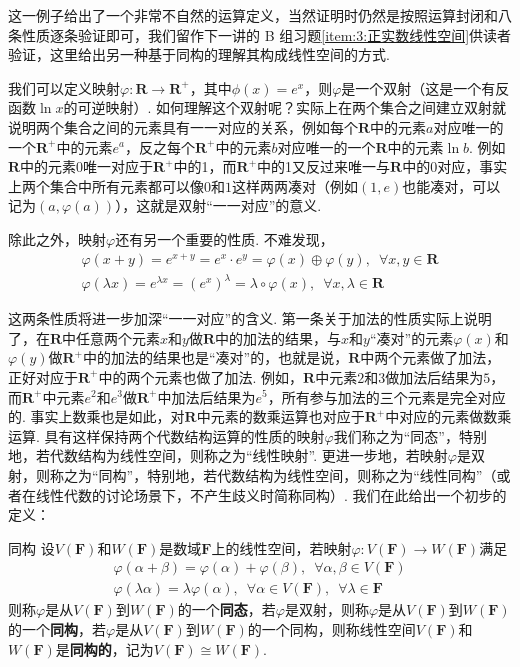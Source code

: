 这一例子给出了一个非常不自然的运算定义，当然证明时仍然是按照运算封闭和八条性质逐条验证即可，我们留作下一讲的 B 组习题\ref{item:3:正实数线性空间}供读者验证，这里给出另一种基于同构的理解其构成线性空间的方式.

我们可以定义映射$\varphi\colon\mathbf{R}\to\mathbf{R}^+$，其中$\phi(x)=e^x$，则$\varphi$是一个双射（这是一个有反函数$\ln x$的可逆映射）. 如何理解这个双射呢？实际上在两个集合之间建立双射就说明两个集合之间的元素具有一一对应的关系，例如每个$\mathbf{R}$中的元素$a$对应唯一的一个$\mathbf{R}^+$中的元素$e^a$，反之每个$\mathbf{R}^+$中的元素$b$对应唯一的一个$\mathbf{R}$中的元素$\ln b$. 例如$\mathbf{R}$中的元素$0$唯一对应于$\mathbf{R}^+$中的1，而$\mathbf{R}^+$中的1又反过来唯一与$\mathbf{R}$中的$0$对应，事实上两个集合中所有元素都可以像$0$和$1$这样两两凑对（例如$(1,e)$也能凑对，可以记为$(a,\varphi(a))$），这就是双射``一一对应''的意义.

除此之外，映射$\varphi$还有另一个重要的性质. 不难发现，
\begin{gather*}
    \varphi(x+y)=e^{x+y}=e^x\cdot e^y=\varphi(x)\oplus\varphi(y),\enspace\forall x,y\in\mathbf{R} \\
    \varphi(\lambda x)=e^{\lambda x}=(e^x)^\lambda=\lambda\circ\varphi(x),\enspace\forall x,\lambda\in\mathbf{R}
\end{gather*}

这两条性质将进一步加深``一一对应''的含义. 第一条关于加法的性质实际上说明了，在$\mathbf{R}$中任意两个元素$x$和$y$做$\mathbf{R}$中的加法的结果，与$x$和$y$``凑对''的元素$\varphi(x)$和$\varphi(y)$做$\mathbf{R}^+$中的加法的结果也是``凑对''的，也就是说，$\mathbf{R}$中两个元素做了加法，正好对应于$\mathbf{R}^+$中的两个元素也做了加法. 例如，$\mathbf{R}$中元素$2$和$3$做加法后结果为$5$，而$\mathbf{R}^+$中元素$e^2$和$e^3$做$\mathbf{R}^+$中加法后结果为$e^5$，所有参与加法的三个元素是完全对应的. 事实上数乘也是如此，对$\mathbf{R}$中元素的数乘运算也对应于$\mathbf{R}^+$中对应的元素做数乘运算. 具有这样保持两个代数结构运算的性质的映射$\varphi$我们称之为``同态''，特别地，若代数结构为线性空间，则称之为``线性映射''. 更进一步地，若映射$\varphi$是双射，则称之为``同构''，特别地，若代数结构为线性空间，则称之为``线性同构''（或者在线性代数的讨论场景下，不产生歧义时简称同构）. 我们在此给出一个初步的定义：
\begin{definition}{}{同构}
    设$V(\mathbf{F})$和$W(\mathbf{F})$是数域$\mathbf{F}$上的线性空间，若映射$\varphi\colon V(\mathbf{F})\to W(\mathbf{F})$满足
    \begin{gather*}
        \varphi(\alpha+\beta)=\varphi(\alpha)+\varphi(\beta),\enspace\forall\alpha,\beta\in V(\mathbf{F}) \\
        \varphi(\lambda\alpha)=\lambda\varphi(\alpha),\enspace\forall\alpha\in V(\mathbf{F}),\enspace\forall\lambda\in\mathbf{F}
    \end{gather*}
    则称$\varphi$是从$V(\mathbf{F})$到$W(\mathbf{F})$的一个\textbf{同态}，若$\varphi$是双射，则称$\varphi$是从$V(\mathbf{F})$到$W(\mathbf{F})$的一个\textbf{同构}，若$\varphi$是从$V(\mathbf{F})$到$W(\mathbf{F})$的一个同构，则称线性空间$V(\mathbf{F})$和$W(\mathbf{F})$是\textbf{同构的}，记为$V(\mathbf{F})\cong W(\mathbf{F})$.
\end{definition}

